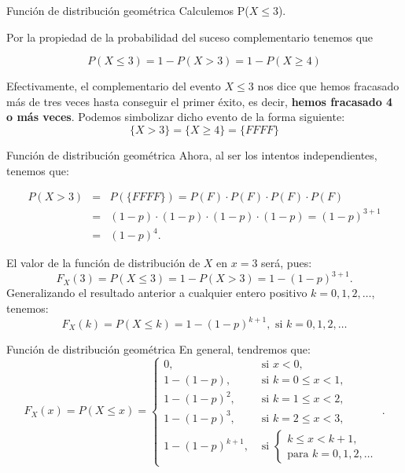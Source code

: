\documentclass[
  ignorenonframetext,
  aspectratio=169]{beamer}
\begin{document}
\begin{frame}{Función de distribución geométrica}
\protect\hypertarget{funciuxf3n-de-distribuciuxf3n-geomuxe9trica}{}
Calculemos P(\(X\leq 3\)).

Por la propiedad de la probabilidad del suceso complementario tenemos
que

\[
P(X\leq 3 )=1-P(X> 3)=1-P(X\geq 4)
\]

Efectivamente, el complementario del evento \(X\leq 3\) nos dice que
hemos fracasado más de tres veces hasta conseguir el primer éxito, es
decir, \textbf{hemos fracasado 4 o más veces}. Podemos simbolizar dicho
evento de la forma siguiente: \[
\{X>3\}=\{X\geq 4\}= \{FFFF\}
\]
\end{frame}

\begin{frame}{Función de distribución geométrica}
\protect\hypertarget{funciuxf3n-de-distribuciuxf3n-geomuxe9trica-1}{}
Ahora, al ser los intentos independientes, tenemos que:

\begin{eqnarray*}
P(X>3) & = & P(\{FFFF\})= P(F)\cdot P(F)\cdot P(F)\cdot P(F)\\
&=& (1-p)\cdot (1-p)\cdot (1-p)\cdot (1-p)= (1-p)^{3+1}\\
&=&(1-p)^{4}.
\end{eqnarray*}

El valor de la función de distribución de \(X\) en \(x=3\) será, pues:
\[F_X(3)=P(X\leq 3)=1-P(X>3)=1-(1-p)^{3+1}.\] Generalizando el resultado
anterior a cualquier entero positivo \(k=0,1,2,\ldots\), tenemos:
\[F_X(k)=P(X\leq k)=1-(1-p)^{k+1},\mbox{ si } k=0,1,2,\ldots\]
\end{frame}

\begin{frame}{Función de distribución geométrica}
\protect\hypertarget{funciuxf3n-de-distribuciuxf3n-geomuxe9trica-2}{}
En general, tendremos que: \[
F_X(x)=P(X\leq x)=
\left\{\begin{array}{ll} 
0, & \mbox{ si } x<0,\\
1- (1-p),  & \mbox{ si } k=0\leq x <1,\\
1- (1-p)^2, & \mbox{ si } k=1\leq x <2,\\
1- (1-p)^3, & \mbox{ si } k=2\leq x <3,\\
1- (1-p)^{k+1}, & \mbox{ si } \left\{ \begin{array}{l}k\leq x< k+1,\\\mbox{para } k=0,1,2,\ldots\end{array}
    \right.
\end{array}
\right..
\]
\end{frame}
\end{document}

